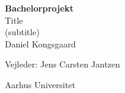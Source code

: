 \hypersetup{pageanchor=false}
\begin{titlingpage}
  \centering
  {\Huge\bfseries Bachelorprojekt} \\[2.5em]
  {\Huge Title} \\[1.5em]
  {\huge (subtitle)} \\[2.5em]
  {\huge Daniel Kongsgaard}
  \vfill
  
  {\huge Vejleder: Jens Carsten Jantzen}
  \vfill

  {\Large Aarhus Universitet}
\end{titlingpage}
\hypersetup{pageanchor=true}

